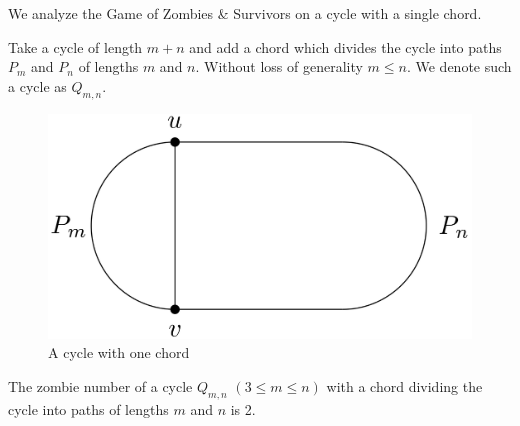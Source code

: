 We analyze the Game of Zombies \& Survivors on a cycle with a single chord.

\begin{definition}
 Take a cycle of length $m+n$ and add a chord which
 divides the cycle into paths $P_m$ and $P_n$ of lengths $m$ and $n$.
 Without loss of generality $m \leq n$. We denote such a cycle as $Q_{m,n}$.
\end{definition}

\begin{figure}
  \centering
 \includegraphics[scale=0.15]{q_m_n/Q_m_n_basic}
 \caption{A cycle with one chord \label{fig:Q_m_n_basic}}
\end{figure}

\begin{theorem}
 The zombie number of a cycle $Q_{m,n}$  $(3 \leq m \leq n)$ with
 a chord dividing the cycle into paths of lengths $m$ and $n$ is 2.
\end{theorem}


